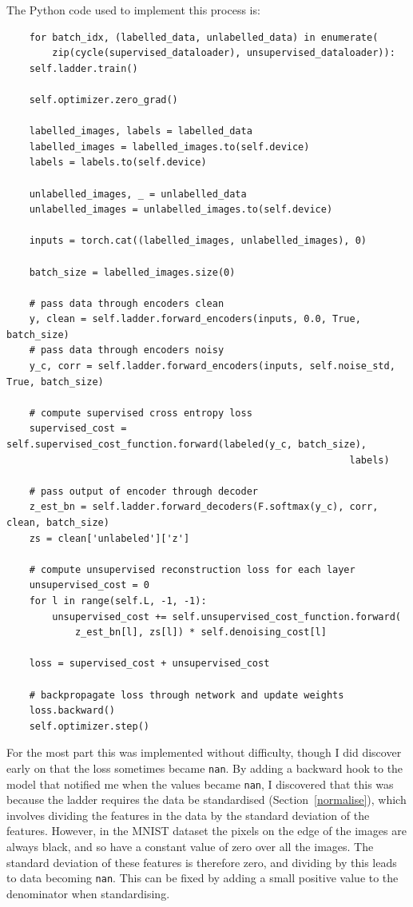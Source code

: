 The Python code used to implement this process is:

{\renewcommand{\baselinestretch}{0.8}\small
    \begin{verbatim}
    for batch_idx, (labelled_data, unlabelled_data) in enumerate(
        zip(cycle(supervised_dataloader), unsupervised_dataloader)):
    self.ladder.train()

    self.optimizer.zero_grad()

    labelled_images, labels = labelled_data
    labelled_images = labelled_images.to(self.device)
    labels = labels.to(self.device)

    unlabelled_images, _ = unlabelled_data
    unlabelled_images = unlabelled_images.to(self.device)

    inputs = torch.cat((labelled_images, unlabelled_images), 0)

    batch_size = labelled_images.size(0)
    
    # pass data through encoders clean
    y, clean = self.ladder.forward_encoders(inputs, 0.0, True, batch_size)
    # pass data through encoders noisy
    y_c, corr = self.ladder.forward_encoders(inputs, self.noise_std, True, batch_size)

    # compute supervised cross entropy loss
    supervised_cost = self.supervised_cost_function.forward(labeled(y_c, batch_size), 
                                                            labels)
    
    # pass output of encoder through decoder
    z_est_bn = self.ladder.forward_decoders(F.softmax(y_c), corr, clean, batch_size)
    zs = clean['unlabeled']['z']
    
    # compute unsupervised reconstruction loss for each layer
    unsupervised_cost = 0
    for l in range(self.L, -1, -1):
        unsupervised_cost += self.unsupervised_cost_function.forward(
            z_est_bn[l], zs[l]) * self.denoising_cost[l]
     
    loss = supervised_cost + unsupervised_cost
    
    # backpropagate loss through network and update weights
    loss.backward()
    self.optimizer.step()
    \end{verbatim}
}

For the most part this was implemented without difficulty, though I did discover early on that the loss sometimes became \texttt{nan}.
By adding a backward hook to the model that notified me when the values became \texttt{nan}, I discovered that this was because 
the ladder requires the data be standardised (Section~\ref{normalise}), which involves dividing the features in the data by the standard deviation of the 
features. However, in the MNIST dataset the pixels on the edge of the images are always black, and so have a constant value of zero over 
all the images. The standard deviation of these features is therefore zero, and dividing by this leads to data becoming \texttt{nan}.
This can be fixed by adding a small positive value to the denominator when standardising.

